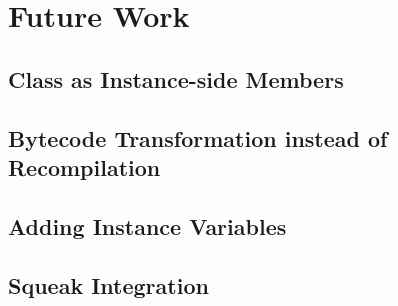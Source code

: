 \chapter{Future Work}

\section{Class as Instance-side Members}
\label{sec:future_inst_side}

\section{Bytecode Transformation instead of Recompilation}

\section{Adding Instance Variables}

\section{Squeak Integration}
